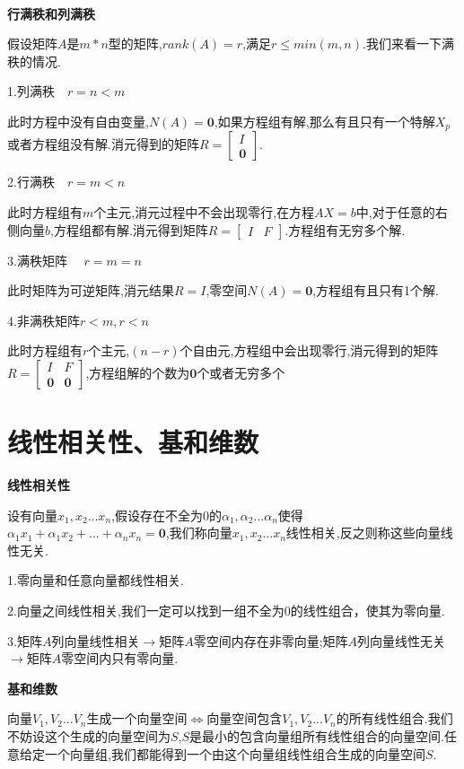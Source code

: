 \documentclass[oneside]{book}
\begin{document}
\hspace{\fill}\

\textbf{行满秩和列满秩}

假设矩阵$A$是$m*n$型的矩阵,$rank(A)=r$,满足$r\leqslant min(m,n)$.我们来看一下满秩的情况.

1.列满秩$\quad r=n<m$

此时方程中没有自由变量,$N(A)=\textbf{0}$,如果方程组有解,那么有且只有一个特解$X_{p}$或者方程组没有解.消元得到的矩阵$R=\left[\begin{array}{c}
	I\\\textbf{0}
\end{array}\right]$.

2.行满秩$\quad r=m<n$

此时方程组有$m$个主元,消元过程中不会出现零行,在方程$AX=b$中,对于任意的右侧向量$b$,方程组都有解.消元得到矩阵$R=\left[\begin{array}{cc}
	I&F
\end{array}\right]$.方程组有无穷多个解.

3.满秩矩阵 $\quad r=m=n$

此时矩阵为可逆矩阵,消元结果$R=I$,零空间$N(A)=\textbf{0}$,方程组有且只有1个解.

4.非满秩矩阵$r<m,r<n$

此时方程组有$r$个主元,$(n-r)$个自由元,方程组中会出现零行,消元得到的矩阵$R=\left[\begin{array}{cc}
	I&F\\\textbf{0}&\textbf{0}
\end{array}\right]$,方程组解的个数为$\textbf{0}$个或者无穷多个
	\chapter{线性相关性、基和维数}
	\textbf{线性相关性}
	
	设有向量$x_{1},x_{2}...x_{n}$,假设存在不全为$0$的$\alpha_{1},\alpha_{2}...\alpha_{n}$使得$\alpha_{1}x_{1}+\alpha_{1}x_{2}+...+\alpha_{n}x_{n}= \textbf{0}$,我们称向量$x_{1},x_{2}...x_{n}$线性相关,反之则称这些向量线性无关.
	
	1.零向量和任意向量都线性相关.
	
	2.向量之间线性相关,我们一定可以找到一组不全为0的线性组合，使其为零向量.
	
	3.矩阵$A$列向量线性相关$\rightarrow$矩阵$A$零空间内存在非零向量;矩阵$A$列向量线性无关$\rightarrow$矩阵$A$零空间内只有零向量.
	
	\textbf{基和维数}
	
	向量$V_{1},V_{2}...V_{n}$生成一个向量空间$\Leftrightarrow$向量空间包含$V_{1},V_{2}...V_{n}$的所有线性组合.我们不妨设这个生成的向量空间为$S$,$S$是最小的包含向量组所有线性组合的向量空间.任意给定一个向量组,我们都能得到一个由这个向量组线性组合生成的向量空间$S$.
	
\end{document}
